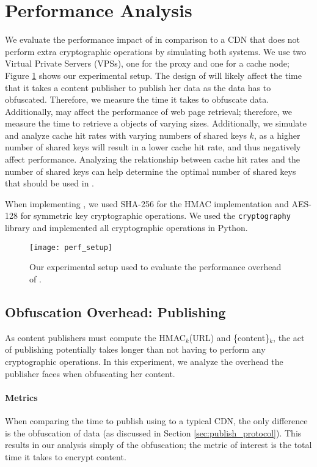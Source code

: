 \section{Performance Analysis}
\label{sec:performance}

We evaluate the performance impact of \system{} in comparison to a CDN that does not perform extra cryptographic operations by simulating both systems.   
We use two Virtual Private Servers (VPSs), one for the proxy and one for a cache node; Figure \ref{fig:perf_setup} shows our 
experimental setup.  The design of \system{} will likely affect the time that it takes a content publisher to publish her data as
the data has to obfuscated.  Therefore, we measure the time it takes to obfuscate data.  Additionally, \system{} may affect the performance of web page retrieval; therefore, we measure the time to retrieve a objects of varying sizes.  Additionally, we simulate and analyze cache hit rates with varying numbers of 
shared keys $k$, as a higher number of shared keys will result in a lower cache hit rate, and thus negatively affect performance. Analyzing the relationship between cache hit
rates and the number of shared keys can help determine the optimal number of shared keys that should be used in \system{}.

When implementing \system{}, we used SHA-256 for the HMAC implementation and AES-128 for symmetric key cryptographic operations.  We used the {\tt cryptography} library and implemented 
all cryptographic operations in Python.  

\begin{figure}[t]
\centering
\texttt{[image: perf\_setup]}
\caption{Our experimental setup used to evaluate the performance overhead of \system{}.}
\label{fig:perf_setup}
\end{figure}

\subsection{Obfuscation Overhead: Publishing}
As content publishers must compute the HMAC$_k$(URL) and \{content\}$_k$, the act of publishing potentially 
takes longer than not having to perform any cryptographic operations.  In this experiment, we analyze the overhead 
the publisher faces when obfuscating her content.\\

\paragraph{Metrics}
When comparing the time to publish using \system{} to a typical CDN, the only difference is the obfuscation of 
data (as discussed in Section \ref{sec:publish_protocol}).  This results in our analysis simply of the 
obfuscation; the metric of interest is the total time it takes to encrypt content.  \\

